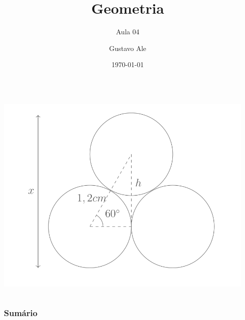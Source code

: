 \documentclass[handout]{beamer}
\title{Geometria} %
\subtitle{Aula 04}
\author{Gustavo Ale} %
\institute[UFMT] %
{
EduCursinho - Faculdade de Engenharia \\ %
\medskip
\textit{gustavo.engca@gmail.com} %
}
\date{\today} %
\begin{document}
{
\begin{frame}
    \begin{columns}
        \begin{column}{0.48\textwidth}
            \includegraphics[width=\columnwidth,left]{../assets/geo.png}
        \end{column}
        \begin{column}{0.48\textwidth}
            \titlepage
        \end{column}
    \end{columns}

\end{frame}
}


\begin{frame}
    \frametitle{Sumário} %
    \tableofcontents %
\end{frame}
\end{document}
